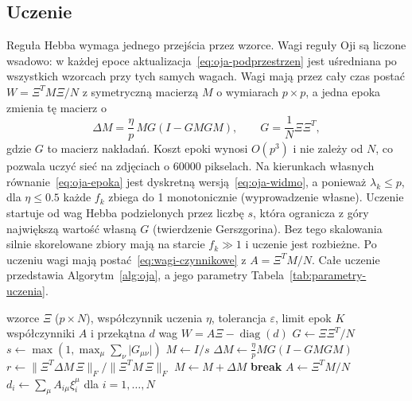 \subsection{Uczenie}
\label{sec:uczenie}

Reguła Hebba wymaga jednego przejścia przez wzorce. Wagi reguły Oji są liczone wsadowo: w każdej epoce aktualizacja~\eqref{eq:oja-podprzestrzen} jest uśredniana po wszystkich wzorcach przy tych samych wagach. Wagi mają przez cały czas postać $W = \Xi^T M \Xi / N$ z symetryczną macierzą $M$ o wymiarach $p \times p$, a jedna epoka zmienia tę macierz o
\begin{equation}
    \Delta M = \frac{\eta}{p} \, M G \left(I - G M G M\right), \qquad G = \frac{1}{N} \Xi \Xi^T,
    \label{eq:oja-epoka}
\end{equation}
gdzie $G$ to macierz nakładań. Koszt epoki wynosi $O(p^3)$ i nie zależy od $N$, co pozwala uczyć sieć na zdjęciach o \num{60000} pikselach. Na kierunkach własnych równanie~\eqref{eq:oja-epoka} jest dyskretną wersją~\eqref{eq:oja-widmo}, a ponieważ $\lambda_k \le p$, dla $\eta \le \num{0.5}$ każde $f_k$ zbiega do 1 monotonicznie (wyprowadzenie własne). Uczenie startuje od wag Hebba podzielonych przez liczbę $s$, która ogranicza z góry największą wartość własną $G$ (twierdzenie Gerszgorina). Bez tego skalowania silnie skorelowane zbiory mają na starcie $f_k \gg 1$ i uczenie jest rozbieżne. Po uczeniu wagi mają postać~\eqref{eq:wagi-czynnikowe} z $A = \Xi^T M / N$. Całe uczenie przedstawia Algorytm~\ref{alg:oja}, a jego parametry Tabela~\ref{tab:parametry-uczenia}.

\begin{algorithm}[H]
    \caption{Uczenie regułą Oji (wariant podprzestrzeni, wsadowo).}
    \label{alg:oja}
    \begin{algorithmic}[1]
        \Require wzorce $\Xi$ ($p \times N$), współczynnik uczenia $\eta$, tolerancja $\varepsilon$, limit epok $K$
        \Ensure współczynniki $A$ i przekątna $d$ wag $W = A \Xi - \operatorname{diag}(d)$
        \State $G \gets \Xi \Xi^T / N$
        \State $s \gets \max(1, \max_\mu \sum_\nu \lvert G_{\mu\nu} \rvert)$
        \State $M \gets I / s$ 
            \State $\Delta M \gets \frac{\eta}{p} M G (I - G M G M)$
            \State $r \gets \lVert \Xi^T \Delta M \, \Xi \rVert_F / \lVert \Xi^T M \, \Xi \rVert_F$ 
            \State $M \gets M + \Delta M$
                \State \textbf{break}
            \EndIf
        \EndFor
        \State $A \gets \Xi^T M / N$
        \State $d_i \gets \sum_\mu A_{i\mu} \xi^\mu_i$ dla $i = 1, \ldots, N$ 
    \end{algorithmic}
\end{algorithm}

